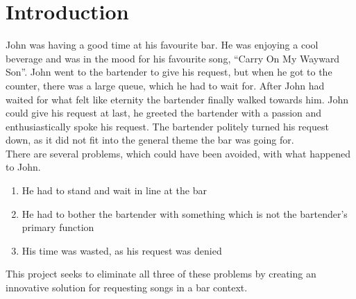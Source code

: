 \chapter{Introduction}
John was having a good time at his favourite bar. He was enjoying a cool beverage and was in the mood for his favourite song, \enquote{Carry On My Wayward Son}. John went to the bartender to give his request, but when he got to the counter, there was a large queue, which he had to wait for. After John had waited for what felt like eternity the bartender finally walked towards him. John could give his request at last, he greeted the bartender with a passion and enthusiastically spoke his request. The bartender politely turned his request down, as it did not fit into the general theme the bar was going for.\\

There are several problems, which could have been avoided, with what happened to John. 
\begin{enumerate}
	\item He had to stand and wait in line at the bar
	\item He had to bother the bartender with something which is not the bartender's primary function
	\item His time was wasted, as his request was denied
\end{enumerate}
This project seeks to eliminate all three of these problems by creating an innovative solution for requesting songs in a bar context.

